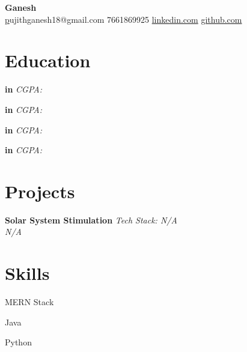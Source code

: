 \documentclass[a4paper,10pt]{article}
\begin{document}
\begin{center}
    {\huge \textbf{ Ganesh }} \\
    \vspace{5pt}
    \small \href{mailto:pujithganesh18@gmail.com } pujithganesh18@gmail.com \quad \textbullet{} 7661869925 \quad  \quad \textbullet{} \href{ https://www.linkedin.com/in/ganesh10-/ }{linkedin.com} \quad \textbullet{} \href{  }{github.com}
\end{center}

\section*{Education}

\noindent
\textbf{  in  } \hfill  \textit{ CGPA:  } \\
  \hfill  \textit  
\vspace{0.3cm}

\noindent
\textbf{  in  } \hfill  \textit{ CGPA:  } \\
  \hfill  \textit  
\vspace{0.3cm}

\noindent
\textbf{  in  } \hfill  \textit{ CGPA:  } \\
  \hfill  \textit  
\vspace{0.3cm}

\noindent
\textbf{  in  } \hfill  \textit{ CGPA:  } \\
  \hfill  \textit  
\vspace{0.3cm}



\section*{Projects}

\noindent
\textbf{ Solar System Stimulation } \hfill \textit{Tech Stack: N/A } \\
\vspace{5pt} \textit{ N/A }
\begin{compactitem}
    \item 
\end{compactitem}




\section*{Skills}
\noindent
\begin{compactitem}
    
        \item MERN Stack 
    
        \item Java 
    
        \item Python
    
\end{compactitem}
\end{document}
